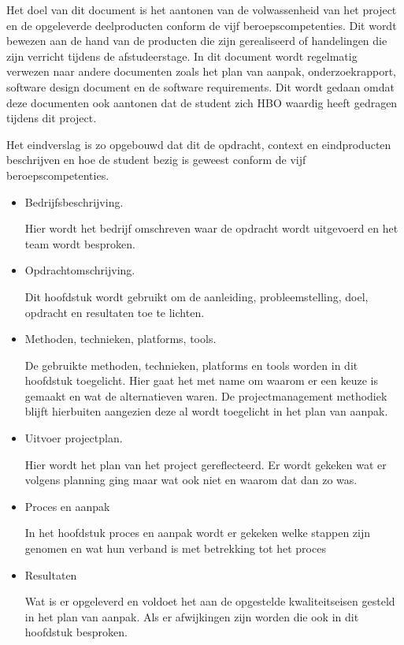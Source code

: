 \documentclass[a4paper, 11pt, oneside]{report}
\begin{document}
Het doel van dit document is het aantonen van de volwassenheid van het project en de opgeleverde deelproducten conform de vijf beroepscompetenties.
Dit wordt bewezen aan de hand van de producten die zijn gerealiseerd of handelingen die zijn verricht tijdens de afstudeerstage. In dit document wordt regelmatig verwezen naar andere documenten zoals het plan van aanpak, onderzoekrapport, software design document en de software requirements. Dit wordt gedaan omdat deze documenten ook aantonen dat de student zich HBO waardig heeft gedragen tijdens dit project.  

Het eindverslag is zo opgebouwd dat dit de opdracht, context en eindproducten beschrijven en hoe de student bezig is geweest conform de vijf beroepscompetenties.

\begin{itemize}
	\item Bedrijfsbeschrijving.
	
	Hier wordt het bedrijf omschreven waar de opdracht wordt uitgevoerd en het team wordt besproken.
	\item Opdrachtomschrijving.
	
	Dit hoofdstuk wordt gebruikt om de aanleiding, probleemstelling, doel, opdracht en resultaten toe te lichten.
	
	\item Methoden, technieken, platforms, tools.
	
	De gebruikte methoden, technieken, platforms en tools worden in dit hoofdstuk toegelicht. Hier gaat het met name om waarom er een keuze is gemaakt en wat de alternatieven waren. De projectmanagement methodiek blijft hierbuiten aangezien deze al wordt toegelicht in het plan van aanpak.
	
	\item Uitvoer projectplan.
	
	Hier wordt het plan van het project gereflecteerd. Er wordt gekeken wat er volgens planning ging maar wat ook niet en waarom dat dan zo was.
	
	\item Proces en aanpak
	
	In het hoofdstuk proces en aanpak wordt er gekeken welke stappen zijn genomen en wat hun verband is met betrekking tot het proces
	
	\item Resultaten
	
	Wat is er opgeleverd en voldoet het aan de opgestelde kwaliteitseisen gesteld in het plan van aanpak. Als er afwijkingen zijn worden die ook in dit hoofdstuk besproken.
	

\end{itemize}
\end{document}
